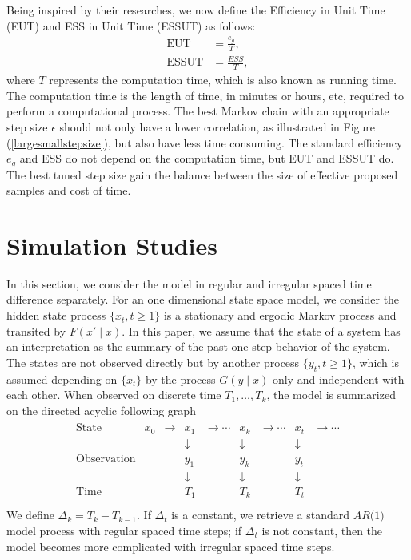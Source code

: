 Being inspired by their researches, we now define the Efficiency in Unit Time (EUT)  and ESS in Unit Time (ESSUT) as follows: 
\begin{align}
\mbox{EUT}     &= \frac{e_g}{T},\\
\mbox{ESSUT} &= \frac{ESS}{T},
\end{align} 
where $T$ represents the computation time, which is also known as running time. The computation time is the length of time, in minutes or hours, etc, required to perform a computational process. The best Markov chain with an appropriate step size $\epsilon$ should not only have a lower correlation, as illustrated in Figure (\ref{largesmallstepsize}), but also have less time consuming. The standard efficiency $e_g$ and ESS do not depend on the computation time, but EUT and ESSUT do. The best tuned step size gain the balance between the size of effective proposed samples and cost of time. 




\section{Simulation Studies}

In this section, we consider the model in regular and irregular spaced time difference separately. For an one dimensional state space model, we consider the hidden state process $\{x_t, t\geq 1\}$ is a stationary and ergodic Markov process and transited by $F(x'\mid x)$. In this paper, we assume that the state of a system has an interpretation as the summary of the past one-step behavior of the system. The states are not observed directly but by another process $\{y_t, t\geq 1\}$, which is assumed depending on $\{x_t\}$ by the process $G(y\mid x)$ only and independent with each other. When observed on discrete time $T_1,\dots,T_k$, the model is summarized on the directed acyclic following graph  
\begin{align*}
\begin{matrix}
\mbox{State}  & x_0     &  \rightarrow& x_1   & \rightarrow \cdots  & x_k  & \rightarrow \cdots & x_t & \rightarrow \cdots\\
          & &       & \downarrow &         &\downarrow &        &\downarrow &   \\
\mbox{Observation}& && y_1               &          & y_k               &        & y_t               &   \\
          & &      & \downarrow &          &\downarrow  &        &\downarrow &   \\
\mbox{Time } & &       & T_1               &          & T_k               &        & T_t               &   \\
\end{matrix}
\end{align*}
We define $\Delta_k = T_k-T_{k-1}$. If $\Delta_t$ is a constant, we retrieve a standard  $\textit{AR(1)}$ model process with regular spaced time steps; if $\Delta_t$ is not constant, then the model becomes more complicated with irregular spaced time steps. 


